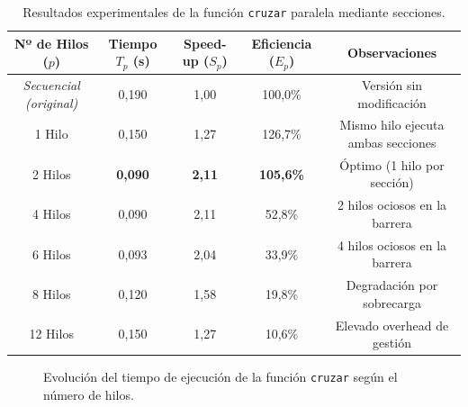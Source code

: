 \documentclass[12pt]{article}
\begin{document}
\begin{enumerate}
\begin{table}[htbp]
    \centering
    \small
    \begin{tabular}{ccccc}
        \toprule
        \textbf{Nº de Hilos ($p$)} & \textbf{Tiempo $T_p$ (s)} & \textbf{Speed-up ($S_p$)} & \textbf{Eficiencia ($E_p$)} & \textbf{Observaciones} \\
        \midrule
        \textit{Secuencial (original)} & 0,190 & 1,00 & 100,0\% & Versión sin modificación \\
        1 Hilo   & 0,150 & 1,27 & 126,7\% & Mismo hilo ejecuta ambas secciones \\
        2 Hilos  & \textbf{0,090} & \textbf{2,11} & \textbf{105,6\%} & Óptimo (1 hilo por sección) \\
        4 Hilos  & 0,090 & 2,11 & 52,8\%  & 2 hilos ociosos en la barrera \\
        6 Hilos  & 0,093 & 2,04 & 33,9\%  & 4 hilos ociosos en la barrera \\
        8 Hilos  & 0,120 & 1,58 & 19,8\%  & Degradación por sobrecarga \\
        12 Hilos & 0,150 & 1,27 & 10,6\%  & Elevado overhead de gestión \\
        \bottomrule
    \end{tabular}
    \caption{Resultados experimentales de la función \texttt{cruzar} paralela mediante secciones.}
    \label{tab:cuestion5_secciones}
\end{table}
\begin{figure}[htbp]
    \centering
    \caption{Evolución del tiempo de ejecución de la función \texttt{cruzar} según el número de hilos.}
    \label{fig:grafica_cuestion5}
\end{figure}



\end{enumerate}
\end{document}
